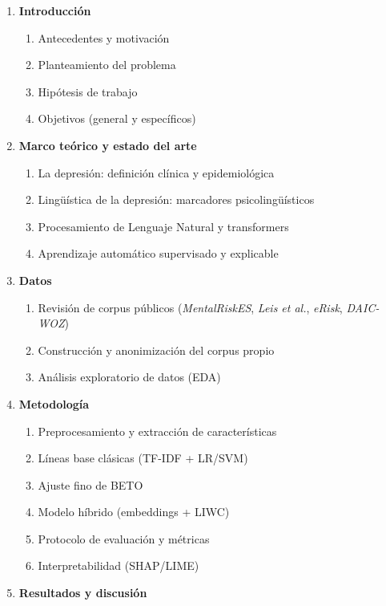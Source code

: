 \documentclass[12pt,a4paper,spanish]{article}
\begin{document}
\begin{enumerate}[leftmargin=2em]
    \item \textbf{Introducción}
    \begin{enumerate}[label=\arabic*.\arabic*.]
        \item Antecedentes y motivación
        \item Planteamiento del problema
        \item Hipótesis de trabajo
        \item Objetivos (general y específicos)
    \end{enumerate}
    \item \textbf{Marco teórico y estado del arte}
    \begin{enumerate}[label=\arabic*.\arabic*.]
        \item La depresión: definición clínica y epidemiológica
        \item Lingüística de la depresión: marcadores psicolingüísticos
        \item Procesamiento de Lenguaje Natural y transformers
        \item Aprendizaje automático supervisado y explicable
    \end{enumerate}
    \item \textbf{Datos}
    \begin{enumerate}[label=\arabic*.\arabic*.]
        \item Revisión de corpus públicos (\emph{MentalRiskES}, \emph{Leis et al.}, \emph{eRisk}, \emph{DAIC-WOZ})
        \item Construcción y anonimización del corpus propio
        \item Análisis exploratorio de datos (EDA)
    \end{enumerate}
    \item \textbf{Metodología}
    \begin{enumerate}[label=\arabic*.\arabic*.]
        \item Preprocesamiento y extracción de características
        \item Líneas base clásicas (TF-IDF + LR/SVM)
        \item Ajuste fino de BETO
        \item Modelo híbrido (embeddings + LIWC)
        \item Protocolo de evaluación y métricas
        \item Interpretabilidad (SHAP/LIME)
    \end{enumerate}
    \item \textbf{Resultados y discusión}

\end{enumerate}
\end{document}

